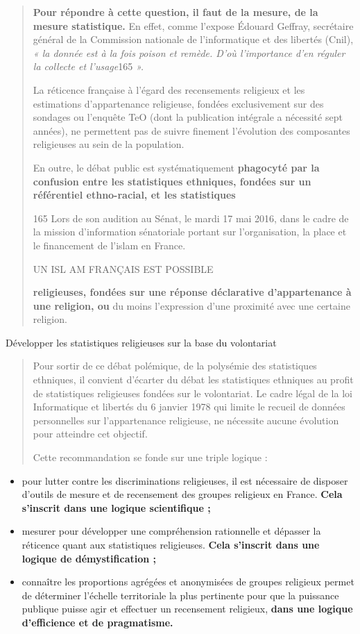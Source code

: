 \begin{quote}
\textbf{Pour répondre à cette question, il faut de la mesure, de la
mesure statistique.} En effet, comme l'expose Édouard Geffray,
secrétaire général de la Commission nationale de l'informatique et des
libertés (Cnil), \emph{« la donnée est à la fois poison et remède. D'où
l'importance d'en réguler la collecte et l'usage}165 \emph{».}

La réticence française à l'égard des recensements religieux et les
estimations d'appartenance religieuse, fondées exclusivement sur des
sondages ou l'enquête TeO (dont la publication intégrale a nécessité
sept années), ne permettent pas de suivre finement l'évolution des
composantes religieuses au sein de la population.

En outre, le débat public est systématiquement \textbf{phagocyté par la
confusion entre les statistiques ethniques, fondées sur un référentiel
ethno-racial, et les statistiques}

165 Lors de son audition au Sénat, le mardi 17 mai 2016, dans le cadre
de la mission d'information sénatoriale portant sur l'organisation, la
place et le financement de l'islam en France.

UN ISL AM FRANÇAIS EST POSSIBLE

\textbf{religieuses, fondées sur une réponse déclarative d'appartenance
à une religion, ou} du moins l'expression d'une proximité avec une
certaine religion.
\end{quote}

Développer les statistiques religieuses sur la base du volontariat

\begin{quote}
Pour sortir de ce débat polémique, de la polysémie des statistiques
ethniques, il convient d'écarter du débat les statistiques ethniques au
profit de statistiques religieuses fondées sur le volontariat. Le cadre
légal de la loi Informatique et libertés du 6 janvier 1978 qui limite le
recueil de données personnelles sur l'appartenance religieuse, ne
nécessite aucune évolution pour atteindre cet objectif.

Cette recommandation se fonde sur une triple logique :
\end{quote}

\begin{itemize}
\item
  pour lutter contre les discriminations religieuses, il est nécessaire
  de disposer d'outils de mesure et de recensement des groupes religieux
  en France. \textbf{Cela s'inscrit dans une logique scientifique ;}
\item
  mesurer pour développer une compréhension rationnelle et dépasser la
  réticence quant aux statistiques religieuses. \textbf{Cela s'inscrit
  dans une logique de démystification ;}
\item
  connaître les proportions agrégées et anonymisées de groupes religieux
  permet de déterminer l'échelle territoriale la plus pertinente pour
  que la puissance publique puisse agir et effectuer un recensement
  religieux, \textbf{dans une logique d'efficience et de pragmatisme.}
\end{itemize}

